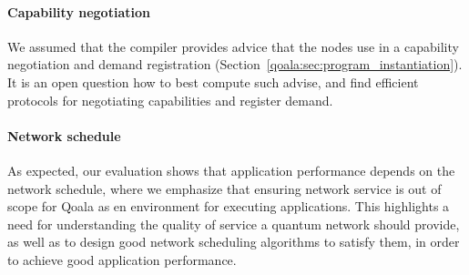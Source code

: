 \paragraph{Capability negotiation}
We assumed that the compiler provides advice that the nodes use in a capability negotiation and demand registration (Section~\ref{qoala:sec:program_instantiation}).
It is an open question how to best compute such advise, and find efficient protocols for negotiating capabilities and register demand.

\paragraph{Network schedule}
As expected, our evaluation shows that application performance depends on the network schedule, where we emphasize that ensuring network service is out of scope for Qoala as en environment for executing applications.
This highlights a need for understanding the quality of service a quantum network should provide, as well as to design good network scheduling algorithms to satisfy them, in order to achieve good application performance.




\begin{xstretch}
\printbibliography[heading=subbibintoc,title={References},notcategory=noprint]
\end{xstretch}
